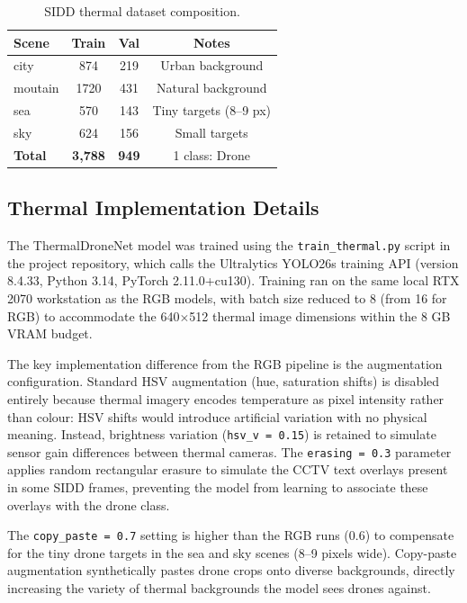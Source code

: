 \documentclass[12pt,a4paper]{report}
\renewcommand{\arraystretch}{1.1}
\begin{document}
\begin{table}[H]
\centering
\caption[SIDD thermal dataset composition]{SIDD thermal dataset composition.}
\label{tab:sidd}
\renewcommand{\arraystretch}{0.9}
\begin{tabular}{|l|c|c|c|}
\hline
\rowcolor{gray!20}
\textbf{Scene} & \textbf{Train} & \textbf{Val} & \textbf{Notes} \\
\hline
city    & 874  & 219 & Urban background \\
\hline
moutain & 1720 & 431 & Natural background \\
\hline
sea     & 570  & 143 & Tiny targets (8--9 px) \\
\hline
sky     & 624  & 156 & Small targets \\
\hline
\textbf{Total} & \textbf{3,788} & \textbf{949} & 1 class: Drone \\
\hline
\end{tabular}
\end{table}

\subsection{Thermal Implementation Details}

The ThermalDroneNet model was trained using the \texttt{train\_thermal.py}
script in the project repository, which calls the Ultralytics YOLO26s
training API (version 8.4.33, Python 3.14, PyTorch 2.11.0+cu130).
Training ran on the same local RTX 2070 workstation as the RGB models,
with batch size reduced to 8 (from 16 for RGB) to accommodate the
640$\times$512 thermal image dimensions within the 8 GB VRAM budget.

The key implementation difference from the RGB pipeline is the augmentation
configuration. Standard HSV augmentation (hue, saturation shifts) is
disabled entirely because thermal imagery encodes temperature as pixel
intensity rather than colour: HSV shifts would introduce artificial
variation with no physical meaning. Instead, brightness variation
(\texttt{hsv\_v = 0.15}) is retained to simulate sensor gain differences
between thermal cameras. The \texttt{erasing = 0.3} parameter applies
random rectangular erasure to simulate the CCTV text overlays present
in some SIDD frames, preventing the model from learning to associate
these overlays with the drone class.

The \texttt{copy\_paste = 0.7} setting is higher than the RGB runs (0.6)
to compensate for the tiny drone targets in the sea and sky scenes
(8--9 pixels wide). Copy-paste augmentation synthetically pastes drone
crops onto diverse backgrounds, directly increasing the variety of
thermal backgrounds the model sees drones against.
\end{document}
